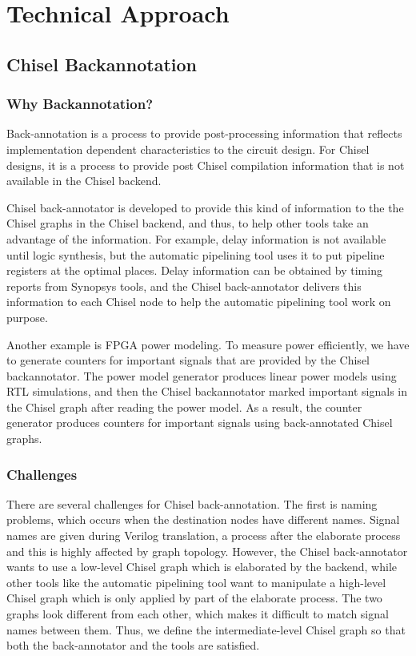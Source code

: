 \section{Technical Approach}
\subsection{Chisel Backannotation}
\subsubsection{Why Backannotation?}
Back-annotation is a process to provide post-processing information that reflects implementation dependent characteristics to the circuit design. For Chisel designs, it is a process to provide post Chisel compilation information that is not available in the Chisel backend. 

Chisel back-annotator is developed to provide this kind of information to the the Chisel graphs in the Chisel backend, and thus, to help other tools take an advantage of the information. For example, delay information is not available until logic synthesis, but the automatic pipelining tool uses it to put pipeline registers at the optimal places. Delay information can be obtained by timing reports from Synopsys tools, and the Chisel back-annotator delivers this information to each Chisel node to help the automatic pipelining tool work on purpose. 

Another example is FPGA power modeling. To measure power efficiently, we have to generate counters for important signals that are provided by the Chisel backannotator. The power model generator produces linear power models using RTL simulations, and then the Chisel backannotator marked important signals in the Chisel graph after reading the power model. As a result, the counter generator produces counters for important signals using back-annotated Chisel graphs.

\subsubsection{Challenges}
There are several challenges for Chisel back-annotation. The first is naming problems, which occurs when the destination nodes have different names. Signal names are given during Verilog translation, a process after the elaborate process and this is highly affected by graph topology. However, the Chisel back-annotator wants to use a low-level Chisel graph which is elaborated by the backend, while other tools like the automatic pipelining tool want to manipulate a high-level Chisel graph which is only applied by part of the elaborate process. The two graphs look different from each other, which makes it difficult to match signal names between them. Thus, we define the intermediate-level Chisel graph so that both the back-annotator and the tools are satisfied.

